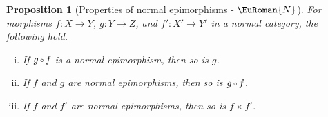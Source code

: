 \documentclass [12pt,oneside]{book}%
\theoremstyle{captionstyle}  %
\newtheorem{proposition}[theorem]{Proposition}
\newenvironment{thmlist}{		%
	\begin{enumerate}[(i)]}{
	\end{enumerate}
}
\newcommand{\from}{\colon}				%
\newcommand{\Comp}{\raisebox{0.1ex}{\ensuremath{\,\scriptstyle{\circ}}\,}}
\newcommand{\NTag}{ - {\color{Brown} $\EuRoman{N}$}}																				%
\begin{document}
\begin{proposition}[Properties of normal epimorphisms\NTag]
    \label{thm:Cokernels-Props-Normal}%
    \label{thm:NormalEpis-Props-Normal}
    For morphisms $ f\from{X\to Y}$, $g\from{Y\to Z}$, and $ f'\from{X'\to Y'}$ in a normal category, the following hold. %
    \begin{thmlist}
        \item \label{thm:Cokernels-Props.gfNEpi->gNEpi}%
        If $ g\Comp f$ is a normal epimorphism, then so is $g$.
        \item \label{thm:Cokernels-Props.f,gNEpis->gfNEpi}%
        If $f$ and $g$ are normal epimorphisms, then so is $g\Comp f$. %
        \item \label{thm:Cokernels-Props.f,g'NEpis->fxf'NEpi}%
        If $f$ and $f'$ are normal epimorphisms, then so is $f\times f'$. %
    \end{thmlist}
\end{proposition}
\end{document}
